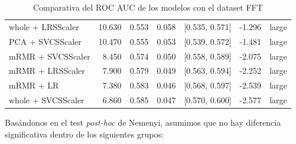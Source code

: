 \documentclass[a4paper,oneside,11pt,leqno]{article}
\begin{document}
\begin{table}[h]
\begin{tabular}{lrrrlll}
			whole + LRSScaler  & 10.630 & 0.553 & 0.058 &  [0.535, 0.571] & -1.296 &       large \\
			PCA + SVCSScaler   & 10.470 & 0.555 & 0.053 &  [0.539, 0.572] & -1.481 &       large \\
			mRMR + SVCSScaler  &  8.450 & 0.574 & 0.050 &  [0.558, 0.589] & -2.075 &       large \\
			mRMR + LRSScaler   &  7.900 & 0.579 & 0.049 &  [0.563, 0.594] & -2.252 &       large \\
			mRMR + LR          &  7.380 & 0.583 & 0.046 &  [0.568, 0.597] & -2.539 &       large \\
			whole + SVCSScaler &  6.860 & 0.585 & 0.047 &  [0.570, 0.600] & -2.577 &       large \\
			\bottomrule
		\end{tabular}
		\caption{Comparativa del ROC AUC de los modelos con el dataset FFT}
		\label{tab:stat_results_fft}
	\end{table}
	
	Basándonos en el test \textit{post-hoc} de Nemenyi, asumimos que no hay diferencia significativa dentro de los siguientes grupos:
	
\end{document}
